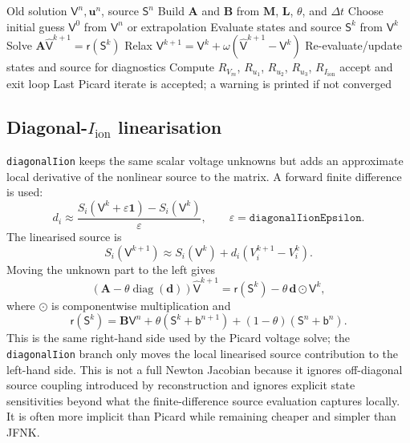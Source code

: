 \documentclass[11pt,a4paper]{article}
\newcommand{\code}[1]{\texttt{\small #1}}
\newcommand{\Vm}{V_m}
\newcommand{\Iion}{I_{\mathrm{ion}}}
\newcommand{\Mmass}{\mathbf{M}}
\newcommand{\Lop}{\mathbf{L}}
\newcommand{\Aimp}{\mathbf{A}}
\newcommand{\Bimp}{\mathbf{B}}
\begin{document}
\begin{algorithm}[h!]
\caption{Picard nonlinear coupling}
\label{alg:picard}
\begin{algorithmic}[1]
\Require Old solution $\mathsf{V}^n,\mathbf{u}^n$, source $\mathsf{S}^n$
\State Build $\Aimp$ and $\Bimp$ from $\Mmass$, $\Lop$, $\theta$, and $\Delta t$
\State Choose initial guess $\mathsf{V}^0$ from $\mathsf{V}^n$ or extrapolation
  \State Evaluate states and source $\mathsf{S}^k$ from $\mathsf{V}^{k}$
  \State Solve $\Aimp\widehat{\mathsf{V}}^{k+1}=\mathsf{r}(\mathsf{S}^k)$
  \State Relax $\mathsf{V}^{k+1}=\mathsf{V}^{k}+\omega(\widehat{\mathsf{V}}^{k+1}-\mathsf{V}^{k})$
  \State Re-evaluate/update states and source for diagnostics
  \State Compute $R_{\Vm}$, $R_{u_1}$, $R_{u_2}$, $R_{u_3}$, $R_{\Iion}$
    \State accept and exit loop
  \EndIf
\EndFor
\Ensure Last Picard iterate is accepted; a warning is printed if not converged
\end{algorithmic}
\end{algorithm}

\subsection{Diagonal-\texorpdfstring{$\Iion$}{Iion} linearisation}

\code{diagonalIion} keeps the same scalar voltage unknowns but adds an
approximate local derivative of the nonlinear source to the matrix. A forward
finite difference is used:
\begin{equation}
  d_i
  \approx
  \frac{S_i(\mathsf{V}^k+\varepsilon\mathbf{1})-S_i(\mathsf{V}^k)}
       {\varepsilon},
  \qquad
  \varepsilon=\texttt{diagonalIionEpsilon}.
  \label{eq:diagonal-derivative}
\end{equation}
The linearised source is
\begin{equation}
  S_i(\mathsf{V}^{k+1})
  \approx
  S_i(\mathsf{V}^{k})
  + d_i\left(V^{k+1}_i-V^k_i\right).
\end{equation}
Moving the unknown part to the left gives
\begin{equation}
  \left(\Aimp-\theta\operatorname{diag}(\mathbf{d})\right)
  \widehat{\mathsf{V}}^{k+1}
  =
  \mathsf{r}(\mathsf{S}^k)
  -
  \theta\,\mathbf{d}\odot\mathsf{V}^{k},
  \label{eq:diagonal-system}
\end{equation}
where $\odot$ is componentwise multiplication and
\begin{equation}
  \mathsf{r}(\mathsf{S}^{k})
  =
  \Bimp\mathsf{V}^{n}
  +\theta\left(\mathsf{S}^{k}+\mathsf{b}^{n+1}\right)
  +(1-\theta)\left(\mathsf{S}^{n}+\mathsf{b}^{n}\right).
\end{equation}
This is the same right-hand side used by the Picard voltage solve; the
\code{diagonalIion} branch only moves the local linearised source contribution
to the left-hand side. This is not a full Newton
Jacobian because it ignores off-diagonal source coupling introduced by
reconstruction and ignores explicit state sensitivities beyond what the
finite-difference source evaluation captures locally. It is often more implicit
than Picard while remaining cheaper and simpler than JFNK.
\end{document}
